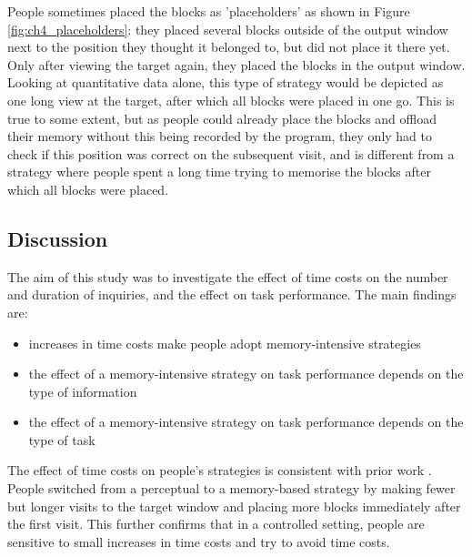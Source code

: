 People sometimes placed the blocks as 'placeholders' as shown in Figure \ref{fig:ch4_placeholders}: they placed several blocks outside of the output window next to the position they thought it belonged to, but did not place it there yet. Only after viewing the target again, they placed the blocks in the output window. Looking at quantitative data alone, this type of strategy would be depicted as one long view at the target, after which all blocks were placed in one go. This is true to some extent, but as people could already place the blocks and offload their memory without this being recorded by the program, they only had to check if this position was correct on the subsequent visit, and is different from a strategy where people spent a long time trying to memorise the blocks after which all blocks were placed.

\newpage

\subsection{Discussion}
The aim of this study was to investigate the effect of time costs on the number and duration of inquiries, and the effect on task performance. The main findings are:

\begin{itemize}
\item
increases in time costs make people adopt memory-intensive strategies
\item
the effect of a memory-intensive strategy on task performance depends on the type of information
\item
the effect of a memory-intensive strategy on task performance depends on the type of task
\end{itemize}



The effect of time costs on people's strategies is consistent with prior work \citep{Gray2006, Morgan2009, Waldron2007}. People switched from a perceptual to a memory-based strategy by making fewer but longer visits to the target window and placing more blocks immediately after the first visit. This further confirms that in a controlled setting, people are sensitive to small increases in time costs and try to avoid time costs.

